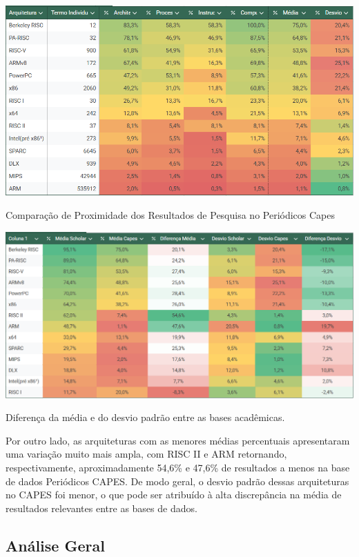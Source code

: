 \documentclass[
	article,			%
	11pt,				%
	oneside,			%
	a4paper,			%
	english,			%
	brazil,				%
	sumario=tradicional
	]{abntex2}
\begin{document}
\begin{table}[H]
    \centering
    \includegraphics[width=1\linewidth]{BaseDeDados/capesProx.png}
    \caption{Comparação de Proximidade dos Resultados de Pesquisa no Periódicos Capes}
    \label{fig:capesProx}
\end{table}

\begin{table}[H]
    \centering
    \includegraphics[width=1\linewidth]{BaseDeDados/diff.png}
    \caption{Diferença da média e do desvio padrão entre as bases acadêmicas.}
    \label{fig:diff}
\end{table}

Por outro lado, as arquiteturas com as menores médias percentuais apresentaram uma variação muito mais ampla, com RISC II e ARM retornando, respectivamente, aproximadamente 54,6\% e 47,6\% de resultados a menos na base de dados Periódicos CAPES. De modo geral, o desvio padrão dessas arquiteturas no CAPES foi menor, o que pode ser atribuído à alta discrepância na média de resultados relevantes entre as bases de dados.
\subsection{Análise Geral}
\end{document}
